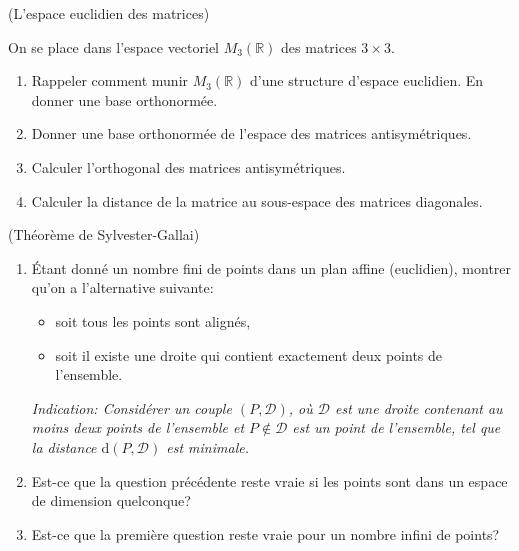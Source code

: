 \documentclass[a4paper,12pt,reqno]{amsart}
\begin{document}
\begin{exo} (L'espace euclidien des matrices)

  On se place dans l'espace vectoriel $M_3(\mathbb{R})$ des matrices $3\times 3$.
  \begin{enumerate}
    \item Rappeler comment munir $M_3(\mathbb{R})$ d'une structure d'espace euclidien. En donner une base orthonormée.
    \item Donner une base orthonormée de l'espace des matrices antisymétriques.
    \item Calculer l'orthogonal des matrices antisymétriques.
    \item Calculer la distance de la matrice%
      \scalebox{.7}{
        $
          \begin{pmatrix}
            1 & 0 & 0 \\
            1 & 0 & 1 \\
            0 & 0 & 1
          \end{pmatrix}
        $
      }
    au sous-espace des matrices diagonales.
  \end{enumerate}
\end{exo}


\begin{exo} (Théorème de Sylvester-Gallai)
  \begin{enumerate}
    \item Étant donné un nombre fini de points dans un plan affine (euclidien), montrer qu'on a l'alternative suivante:
      \begin{itemize}
        \item soit tous les points sont alignés,
        \item soit il existe une droite qui contient exactement deux points de l'ensemble.
      \end{itemize}
      \emph{Indication: Considérer un couple $(P,\mathcal{D})$, où $\mathcal{D}$ est une droite contenant au moins deux points de l'ensemble et $P\notin \mathcal{D}$ est un point de l'ensemble, tel que la distance $\mathrm{d}(P,\mathcal{D})$ est minimale.}

    \item Est-ce que la question précédente reste vraie si les points sont dans un espace de dimension quelconque?

    \item Est-ce que la première question reste vraie pour un nombre infini de points?
  \end{enumerate}
\end{exo}
\end{document}
